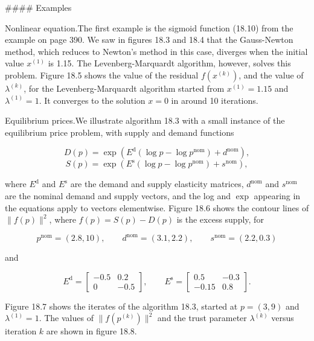 

#### Examples

Nonlinear equation.The first example is the sigmoid function (18.10) from the example on page 390. We saw in figures 18.3 and 18.4 that the Gauss-Newton method, which reduces to Newton's method in this case, diverges when the initial value \(x^{(1)}\) is 1.15. The Levenberg-Marquardt algorithm, however, solves this problem. Figure 18.5 shows the value of the residual \(f(x^{(k)})\), and the value of \(\lambda^{(k)}\), for the Levenberg-Marquardt algorithm started from \(x^{(1)}=1.15\) and \(\lambda^{(1)}=1\). It converges to the solution \(x=0\) in around 10 iterations.

Equilibrium prices.We illustrate algorithm 18.3 with a small instance of the equilibrium price problem, with supply and demand functions

\[D(p) = \exp\left(E^{\mathrm{d}}(\log p-\log p^{\mathrm{nom}})+d^{\mathrm{ nom}}\right),\] \[S(p) = \exp\left(E^{\mathrm{s}}(\log p-\log p^{\mathrm{nom}})+s^{ \mathrm{nom}}\right),\]

where \(E^{\mathrm{d}}\) and \(E^{\mathrm{s}}\) are the demand and supply elasticity matrices, \(d^{\mathrm{nom}}\) and \(s^{\mathrm{nom}}\) are the nominal demand and supply vectors, and the log and \(\exp\) appearing in the equations apply to vectors elementwise. Figure 18.6 shows the contour lines of \(\|f(p)\|^{2}\), where \(f(p)=S(p)-D(p)\) is the excess supply, for

\[p^{\mathrm{nom}}=(2.8,10),\qquad d^{\mathrm{nom}}=(3.1,2.2),\qquad s^{\mathrm{ nom}}=(2.2,0.3)\]

and

\[E^{\mathrm{d}}=\left[\begin{array}{cc}-0.5&0.2\\ 0&-0.5\end{array}\right],\qquad E^{\mathrm{s}}=\left[\begin{array}{cc}0.5&-0. 3\\ -0.15&0.8\end{array}\right].\]

Figure 18.7 shows the iterates of the algorithm 18.3, started at \(p=(3,9)\) and \(\lambda^{(1)}=1\). The values of \(\|f(p^{(k)})\|^{2}\) and the trust parameter \(\lambda^{(k)}\) versus iteration \(k\) are shown in figure 18.8.

